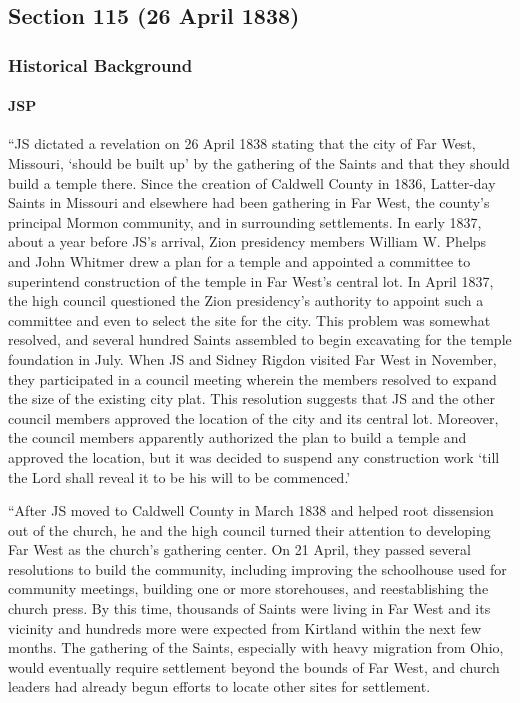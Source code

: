 \subsection{Section 115 (26 April 1838)}
	\label{DC115}
	
	\subsubsection{Historical Background}
		\label{DC115-HB}
		
		\paragraph{JSP}
		
			``JS dictated a revelation on 26 April 1838 stating that the city of Far West, Missouri, `should be built up' by the gathering of the Saints and that they should build a temple there. Since the creation of Caldwell County in 1836, Latter-day Saints in Missouri and elsewhere had been gathering in Far West, the county's principal Mormon community, and in surrounding settlements. In early 1837, about a year before JS's arrival, Zion presidency members William W. Phelps and John Whitmer drew a plan for a temple and appointed a committee to superintend construction of the temple in Far West's central lot. In April 1837, the high council questioned the Zion presidency's authority to appoint such a committee and even to select the site for the city. This problem was somewhat resolved, and several hundred Saints assembled to begin excavating for the temple foundation in July. When JS and Sidney Rigdon visited Far West in November, they participated in a council meeting wherein the members resolved to expand the size of the existing city plat. This resolution suggests that JS and the other council members approved the location of the city and its central lot. Moreover, the council members apparently authorized the plan to build a temple and approved the location, but it was decided to suspend any construction work `till the Lord shall reveal it to be his will to be commenced.'
			
			``After JS moved to Caldwell County in March 1838 and helped root dissension out of the church, he and the high council turned their attention to developing Far West as the church's gathering center. On 21 April, they passed several resolutions to build the community, including improving the schoolhouse used for community meetings, building one or more storehouses, and reestablishing the church press. By this time, thousands of Saints were living in Far West and its vicinity and hundreds more were expected from Kirtland within the next few months. The gathering of the Saints, especially with heavy migration from Ohio, would eventually require settlement beyond the bounds of Far West, and church leaders had already begun efforts to locate other sites for settlement.
			
